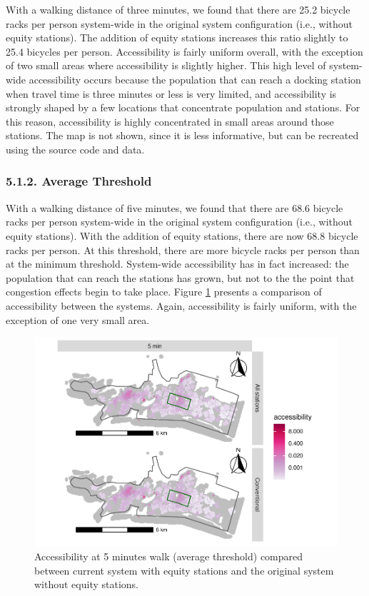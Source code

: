 \documentclass[]{elsarticle} %
\begin{document}
With a walking distance of three minutes, we found that there are 25.2
bicycle racks per person system-wide in the original system
configuration (i.e., without equity stations). The addition of equity
stations increases this ratio slightly to 25.4 bicycles per person.
Accessibility is fairly uniform overall, with the exception of two small
areas where accessibility is slightly higher. This high level of
system-wide accessibility occurs because the population that can reach a
docking station when travel time is three minutes or less is very
limited, and accessibility is strongly shaped by a few locations that
concentrate population and stations. For this reason, accessibility is
highly concentrated in small areas around those stations. The map is not
shown, since it is less informative, but can be recreated using the
source code and data.

\hypertarget{average-threshold}{%
\subsubsection{5.1.2. Average Threshold}\label{average-threshold}}

With a walking distance of five minutes, we found that there are 68.6
bicycle racks per person system-wide in the original system
configuration (i.e., without equity stations). With the addition of
equity stations, there are now 68.8 bicycle racks per person. At this
threshold, there are more bicycle racks per person than at the minimum
threshold. System-wide accessibility has in fact increased: the
population that can reach the stations has grown, but not to the the
point that congestion effects begin to take place. Figure
\ref{fig:figure-7} presents a comparison of accessibility between the
systems. Again, accessibility is fairly uniform, with the exception of
one very small area.

\begin{figure}

{\centering \includegraphics[width=0.9\linewidth]{Bike-share-spatial-equity_files/figure-latex/figure-7-1} 

}

\caption{Accessibility at 5 minutes walk (average threshold) compared between current system with equity stations and the original system without equity stations.}\label{fig:figure-7}
\end{figure}
\end{document}
